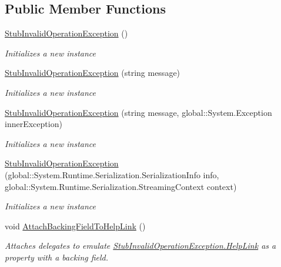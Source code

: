 \subsection*{Public Member Functions}
\begin{DoxyCompactItemize}
\item 
\hyperlink{class_system_1_1_fakes_1_1_stub_invalid_operation_exception_ae896e9a3a9a9b20ed14f0678aba1657b}{Stub\-Invalid\-Operation\-Exception} ()
\begin{DoxyCompactList}\small\item\em Initializes a new instance\end{DoxyCompactList}\item 
\hyperlink{class_system_1_1_fakes_1_1_stub_invalid_operation_exception_a8825570a1384989974fe97ed8309965a}{Stub\-Invalid\-Operation\-Exception} (string message)
\begin{DoxyCompactList}\small\item\em Initializes a new instance\end{DoxyCompactList}\item 
\hyperlink{class_system_1_1_fakes_1_1_stub_invalid_operation_exception_a9eb18ed62c30f9c5a39fdf83d7fb861e}{Stub\-Invalid\-Operation\-Exception} (string message, global\-::\-System.\-Exception inner\-Exception)
\begin{DoxyCompactList}\small\item\em Initializes a new instance\end{DoxyCompactList}\item 
\hyperlink{class_system_1_1_fakes_1_1_stub_invalid_operation_exception_a5a55791f1883b40b34bc424bd355d3a2}{Stub\-Invalid\-Operation\-Exception} (global\-::\-System.\-Runtime.\-Serialization.\-Serialization\-Info info, global\-::\-System.\-Runtime.\-Serialization.\-Streaming\-Context context)
\begin{DoxyCompactList}\small\item\em Initializes a new instance\end{DoxyCompactList}\item 
void \hyperlink{class_system_1_1_fakes_1_1_stub_invalid_operation_exception_a97ae04f5a63a56f402c181cf38a7be6d}{Attach\-Backing\-Field\-To\-Help\-Link} ()
\begin{DoxyCompactList}\small\item\em Attaches delegates to emulate \hyperlink{class_system_1_1_fakes_1_1_stub_invalid_operation_exception_a174fc9ff9bfcf7419921f3185662b211}{Stub\-Invalid\-Operation\-Exception.\-Help\-Link} as a property with a backing field.\end{DoxyCompactList}\item 

\end{DoxyCompactItemize}
